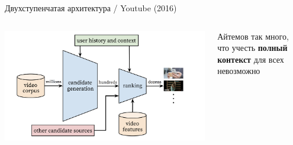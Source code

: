 \documentclass[11pt,aspectratio=169]{beamer}
\begin{document}
\begin{frame}{Двухступенчатая архитектура / Youtube (2016) \cite{YTBE}}
\begin{columns}
\begin{column}{0.6\textwidth}
   \begin{center}
		\includegraphics[scale=0.25]{images/youtube.png}
   \end{center}
\end{column}
\begin{column}{0.3\textwidth}
    \begin{tcolorbox}[colback=info!5,colframe=info!80,title=]
    Айтемов так много, что учесть {\bf полный контекст} для всех невозможно
    \end{tcolorbox}
\end{column}
\end{columns}

\end{frame}
\end{document}
